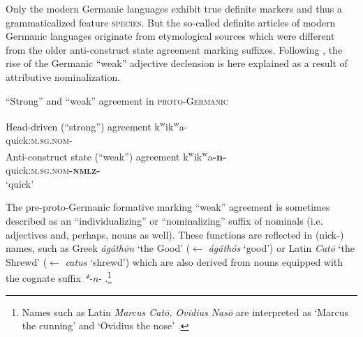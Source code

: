 Only the modern Germanic languages exhibit true definite markers and thus a grammaticalized feature \textsc{species}. But the so-called definite articles of modern Germanic languages originate from etymological sources which were different from the older anti-construct state agreement marking suffixes. Following \citet[267–268]{riesler2006a}, the rise of the Germanic “weak” adjective declension is here explained as a result of attributive nominalization. 
\begin{exe}
\ex “Strong” and “weak” agreement in \textsc{proto-Germanic} \citep[169]{ringe2006}
\begin{xlist}
\ex	Head-driven (“strong”) agreement
\gll *k\textsuperscript{w}ik\textsuperscript{w}a-\\
quick:\textsc{m.sg.nom-}\\
\ex	Anti-construct state (“weak”) agreement
\gll *k\textsuperscript{w}ik\textsuperscript{w}a\textbf{-n-}\\
quick:\textsc{m.sg.nom}\textbf{\textsc{-nmlz-}}\\
\glt	‘quick’
\end{xlist}
\end{exe}
The pre-proto-Germanic formative marking “weak” agreement is sometimes described as an “individualizing” or “nominalizing” suffix of nominals (i.e. adjectives and, perhaps, nouns as well). These functions are reflected in (nick-) names, such as Greek \textit{ágáthōn} ‘the Good’ ($\leftarrow$ \textit{ágáthós} ‘good’) or Latin \textit{Catō} ‘the Shrewd’ ($\leftarrow$ \textit{catus} ‘shrewd’) which are also derived from nouns equipped with the cognate suffix \textit{*-n-} \citep[170]{ringe2006}.\footnote{Names such as Latin \textit{Marcus Catō, Ovidius Nasō} are interpreted as ‘Marcus the cunning’ and ‘Ovidius the nose’ \citep[6–7]{nocentini1996}.}

